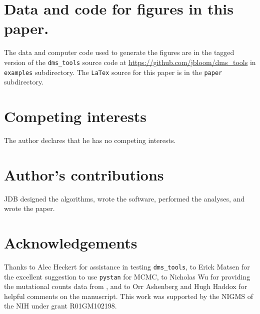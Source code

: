 \documentclass[twocolumn]{bmcart}%
\begin{document}
\section*{Data and code for figures in this paper.}
The data and computer code used to generate the figures are in the tagged version of the \texttt{dms\_tools} source code at \url{https://github.com/jbloom/dms_tools} in \texttt{examples} subdirectory. The \texttt{LaTex} source for this paper is in the \texttt{paper} subdirectory.


\begin{backmatter}

\section*{Competing interests}
  The author declares that he has no competing interests.

\section*{Author's contributions}
JDB designed the algorithms, wrote the software, performed the analyses, and wrote the paper.

\section*{Acknowledgements}
Thanks to Alec Heckert for assistance in testing \texttt{dms\_tools}, to Erick Matsen for the excellent suggestion to use \texttt{pystan} for MCMC,  to Nicholas Wu for providing the mutational counts data from \cite{wu2014ns}, and to Orr Ashenberg and Hugh Haddox for helpful comments on the manuscript. This work was supported by the NIGMS of the NIH under grant R01GM102198.


\end{backmatter}
\end{document}
